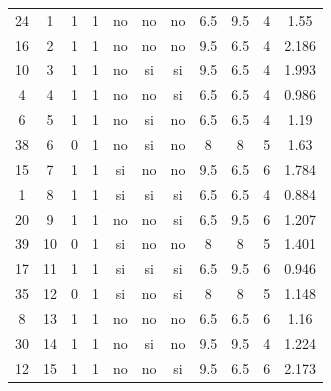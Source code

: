 \documentclass[12pt,a4paper,twoside,openright,titlepage,final]{article}
\begin{document}
\begin{appendices}
\begin{landscape}
\begin{center}
\begin{longtable}{@{\extracolsep{\fill}}*{11}{c}}
							24       & 1            & 1         & 1       & no   & no        & no           & 6.5        & 9.5           & 4             & 1.55   \\
							16       & 2            & 1         & 1       & no   & no        & no           & 9.5        & 6.5           & 4             & 2.186  \\
							10       & 3            & 1         & 1       & no   & si        & si           & 9.5        & 6.5           & 4             & 1.993  \\
							4        & 4            & 1         & 1       & no   & no        & si           & 6.5        & 6.5           & 4             & 0.986  \\
							6        & 5            & 1         & 1       & no   & si        & no           & 6.5        & 6.5           & 4             & 1.19   \\
							38       & 6            & 0         & 1       & no   & si        & no           & 8          & 8             & 5             & 1.63   \\
							15       & 7            & 1         & 1       & si   & no        & no           & 9.5        & 6.5           & 6             & 1.784  \\
							1        & 8            & 1         & 1       & si   & si        & si           & 6.5        & 6.5           & 4             & 0.884  \\
							20       & 9            & 1         & 1       & no   & no        & si           & 6.5        & 9.5           & 6             & 1.207  \\
							39       & 10           & 0         & 1       & si   & no        & no           & 8          & 8             & 5             & 1.401  \\
							17       & 11           & 1         & 1       & si   & si        & si           & 6.5        & 9.5           & 6             & 0.946  \\
							35       & 12           & 0         & 1       & si   & no        & si           & 8          & 8             & 5             & 1.148  \\
							8        & 13           & 1         & 1       & no   & no        & no           & 6.5        & 6.5           & 6             & 1.16   \\
							30       & 14           & 1         & 1       & no   & si        & no           & 9.5        & 9.5           & 4             & 1.224  \\
							12       & 15           & 1         & 1       & no   & no        & si           & 9.5        & 6.5           & 6             & 2.173  \\

\end{longtable}
\end{center}
\end{landscape}
\end{appendices}
\end{document}
